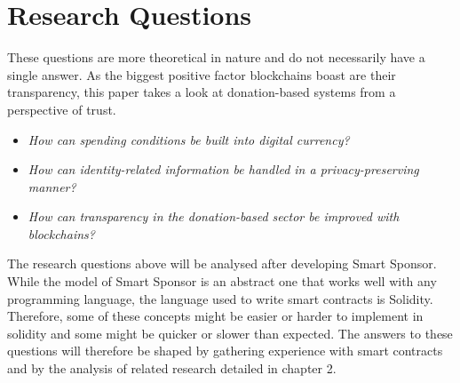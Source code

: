 \section{Research Questions}
These questions are more theoretical in nature and do not necessarily have a single answer. As the biggest positive factor blockchains boast are their transparency, this paper takes a look at donation-based systems from a perspective of trust.
\begin{itemize}
    \item \emph{How can spending conditions be built into digital currency?}
    \item \emph{How can identity-related information be handled in a privacy-preserving manner?}
    \item \emph{How can transparency in the donation-based sector be improved with blockchains?}
\end{itemize}
The research questions above will be analysed after developing Smart Sponsor. While the model of Smart Sponsor is an abstract one that works well with any programming language, the language used to write smart contracts is Solidity. Therefore, some of these concepts might be easier or harder to implement in solidity and some might be quicker or slower than expected. The answers to these questions will therefore be shaped by gathering experience with smart contracts and by the analysis of related research detailed in chapter 2.